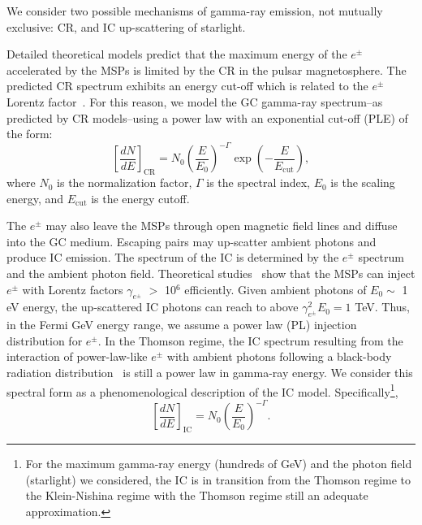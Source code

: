 \documentclass[doublespace,nopageskip]{VTthesis} %
\begin{document}
We consider two possible mechanisms of gamma-ray emission, not mutually exclusive: CR, and IC up-scattering of starlight.

Detailed theoretical models predict that the maximum energy of the $e^\pm$ accelerated by the MSPs is limited by the CR in the pulsar magnetosphere. The predicted CR spectrum exhibits an energy cut-off which is related to the $e^\pm$ Lorentz factor~\citep{2005ApJ...622..531H}. For this reason, we model the GC gamma-ray spectrum--as predicted by CR models--using a power law with an exponential cut-off (PLE) of the form:
\begin{equation}\label{eq:PLE}
    \left[ \frac{dN}{dE} \right]_{\mathrm{CR}} = N_0 \left(\frac{E}{E_0} \right)^{-\Gamma}\exp{ \left( -\frac{E}{E_\text{cut}} \right) },
\end{equation}
where $N_0$ is the normalization factor, $\Gamma$ is the spectral index, $E_0$ is the scaling energy, and $E_\mathrm{cut}$ is the energy cutoff. 

The $e^\pm$ may also leave the MSPs through open magnetic field lines and diffuse into the GC medium. Escaping pairs may up-scatter ambient photons and produce IC emission. The spectrum of the IC is determined by the $e^\pm$ spectrum and the ambient photon field. Theoretical studies~\citep{2011ApJ...743..181H} show that the MSPs can inject $e^\pm$ with Lorentz factors $\gamma_{e^\pm}$ $>$ 10$^6$ efficiently. Given ambient photons of $ E_0\sim$ 1 eV energy, the up-scattered IC photons can reach to above $\gamma_{e^\pm}^2 E_0 = 1$ TeV. Thus, in the Fermi GeV energy range, we assume a power law (PL) injection distribution for $e^\pm$. In the Thomson regime, the IC spectrum resulting from the interaction of power-law-like $e^\pm$ with ambient photons following a black-body radiation distribution~\citep{1970RvMP...42..237B} is still a power law in gamma-ray energy. We consider this spectral form as a phenomenological description of the IC model. Specifically\footnote{For the maximum gamma-ray energy (hundreds of GeV) and the photon field (starlight) we considered, the IC is in transition from the Thomson regime to the Klein-Nishina regime with the Thomson regime still an adequate approximation.},
\begin{equation}\label{eq:PL}
    \left[ \frac{dN}{dE} \right]_{\mathrm{IC}} = N_0 \left(\frac{E}{E_0} \right)^{-\Gamma}.
\end{equation}
\end{document}
